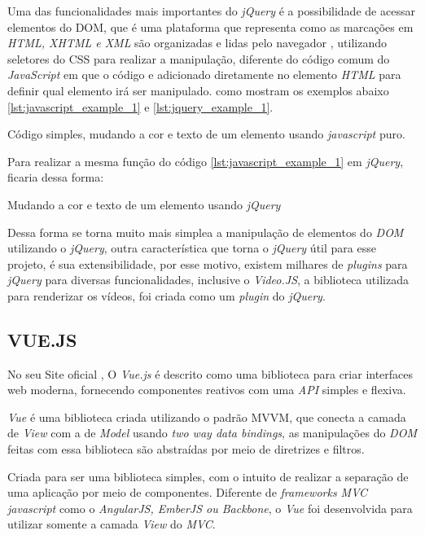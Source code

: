Uma das funcionalidades mais importantes do \textit{jQuery} é a possibilidade de acessar elementos do \ac{DOM}, que é uma plataforma que representa como as marcações em \textit{HTML, XHTML e XML} são organizadas e lidas pelo navegador \cite{franklin-dom}, utilizando seletores do \ac{CSS} para realizar a manipulação, diferente do código comum do \textit{JavaScript} em que o código e adicionado diretamente no elemento \textit{HTML} para definir qual elemento irá ser manipulado. como mostram os exemplos abaixo \ref{lst:javascript_example_1} e \ref{lst:jquery_example_1}.
\begin{listing}[H]
    \caption{Código simples, mudando a cor e texto de um elemento usando \textit{javascript} puro.}
    \label{lst:javascript_example_1}
\end{listing}
Para realizar a mesma função do código \ref{lst:javascript_example_1} em \textit{jQuery}, ficaria dessa forma:
\begin{listing}[H]
      \caption{Mudando a cor e texto de um elemento usando \textit{jQuery}}
      \label{lst:jquery_example_1}
\end{listing}

Dessa forma se torna muito mais simplea a manipulação de elementos do \textit{DOM} utilizando o \textit{jQuery}, outra característica que torna o \textit{jQuery} útil para esse projeto, é sua extensibilidade, por esse motivo, existem milhares de \textit{plugins} para \textit{jQuery} para diversas funcionalidades, inclusive o \textit{Video.JS}, a biblioteca utilizada para renderizar os vídeos, foi criada como um \textit{plugin} do \textit{jQuery}.

\subsection{VUE.JS}

No seu Site oficial , O \textit{Vue.js} é descrito como uma biblioteca para criar interfaces web moderna, fornecendo componentes reativos com uma \textit{API} simples e flexiva.

\textit{Vue} é uma biblioteca criada utilizando o padrão \ac{MVVM}, que conecta a camada de \textit{View} com a de \textit{Model} usando \textit{two way data bindings}, as manipulações do \textit{DOM} feitas com essa biblioteca são abstraídas por meio de diretrizes e filtros.

Criada para ser uma biblioteca simples, com o intuito de realizar a separação de uma aplicação por meio de componentes. Diferente de \textit{frameworks MVC javascript} como o \textit{AngularJS, EmberJS ou Backbone}, o \textit{Vue} foi desenvolvida para utilizar somente a camada \textit{View} do \textit{MVC}.


